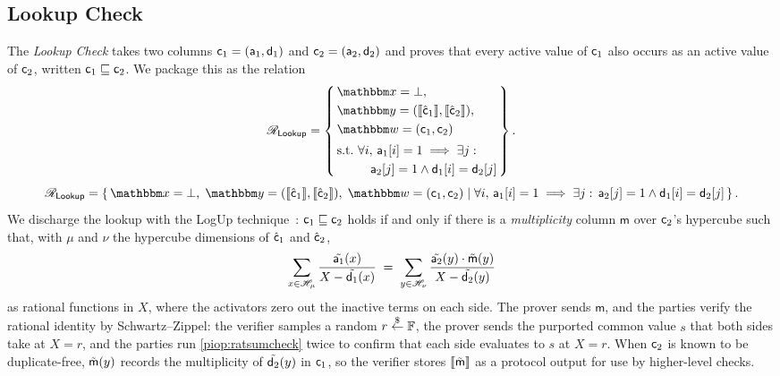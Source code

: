 \subsection{Lookup Check}
The \emph{Lookup Check} takes two columns $\mathsf{c}_1 = (\mathsf{a}_1, \mathsf{d}_1)$ and $\mathsf{c}_2 = (\mathsf{a}_2, \mathsf{d}_2)$ and proves that every active value of $\mathsf{c}_1$ also occurs as an active value of $\mathsf{c}_2$, written $\mathsf{c}_1 \sqsubseteq \mathsf{c}_2$. We package this as the relation
\ifsp
\begin{displaymath}
\NPRelation_{\mathsf{Lookup}} = \left\{\,
  \begin{aligned}
    & \NPInstance = \bot,\\
    & \NPInstancey = (\Oracle{\hat{\col}_1}, \Oracle{\hat{\col}_2}),\\
    & \NPWitness = (\col_1, \col_2)\\[2pt]
    & \text{s.t.}\ \forall i,\, \mathsf{a}_1[i] = 1 \implies \exists j:\\
    & \phantom{\text{s.t.}}\ \quad \mathsf{a}_2[j] = 1 \wedge \mathsf{d}_1[i] = \mathsf{d}_2[j]
  \end{aligned}
\,\right\}.
\end{displaymath}
\else
\begin{displaymath}
\NPRelation_{\mathsf{Lookup}} = \left\{\,
  \NPInstance = \bot,\;
  \NPInstancey = (\Oracle{\hat{\col}_1}, \Oracle{\hat{\col}_2}),\;
  \NPWitness = (\col_1, \col_2)
  \;\middle|\;
    \forall i,\, \mathsf{a}_1[i] = 1 \implies \exists j:\, \mathsf{a}_2[j] = 1 \wedge \mathsf{d}_1[i] = \mathsf{d}_2[j]
\,\right\}.
\end{displaymath}
\fi
We discharge the lookup with the LogUp technique~\cite{Habock22}: $\mathsf{c}_1 \sqsubseteq \mathsf{c}_2$ holds if and only if there is a \emph{multiplicity} column $\mathsf{m}$ over $\mathsf{c}_2$'s hypercube such that, with $\mu$ and $\nu$ the hypercube dimensions of $\hat{\mathsf{c}}_1$ and $\hat{\mathsf{c}}_2$,
\begin{equation}
  \label{eq:lookup-logup}
  \sum_{x \in \mathscr{H}_{\mu}} \frac{\tilde{\mathsf{a}_1}(x)}{X - \tilde{\mathsf{d}_1}(x)}
  \;=\;
  \sum_{y \in \mathscr{H}_{\nu}} \frac{\tilde{\mathsf{a}_2}(y)\cdot\tilde{\mathsf{m}}(y)}{X - \tilde{\mathsf{d}_2}(y)}
\end{equation}
as rational functions in $X$, where the activators zero out the inactive terms on each side. The prover sends $\mathsf{m}$, and the parties verify the rational identity by Schwartz--Zippel: the verifier samples a random $r \overset{\$}{\leftarrow} \mathbb{F}$, the prover sends the purported common value $s$ that both sides take at $X = r$, and the parties run \cref{piop:ratsumcheck} twice to confirm that each side evaluates to $s$ at $X = r$. When $\mathsf{c}_2$ is known to be duplicate-free, $\tilde{\mathsf{m}}(y)$ records the multiplicity of $\tilde{\mathsf{d}_2}(y)$ in $\mathsf{c}_1$, so the verifier stores $\llbracket\tilde{\mathsf{m}}\rrbracket$ as a protocol output for use by higher-level checks.

